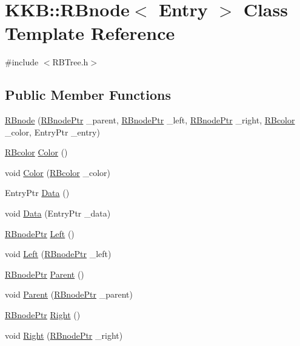 \hypertarget{class_k_k_b_1_1_r_bnode}{}\section{K\+KB\+:\+:R\+Bnode$<$ Entry $>$ Class Template Reference}
\label{class_k_k_b_1_1_r_bnode}


{\ttfamily \#include $<$R\+B\+Tree.\+h$>$}

\subsection*{Public Member Functions}
\begin{DoxyCompactItemize}
\item 
\hyperlink{class_k_k_b_1_1_r_bnode_a8bc55760f92b921b2c73abaad482d89c}{R\+Bnode} (\hyperlink{class_k_k_b_1_1_r_bnode}{R\+Bnode\+Ptr} \+\_\+parent, \hyperlink{class_k_k_b_1_1_r_bnode}{R\+Bnode\+Ptr} \+\_\+left, \hyperlink{class_k_k_b_1_1_r_bnode}{R\+Bnode\+Ptr} \+\_\+right, \hyperlink{namespace_k_k_b_a8efe8f8963250404085241be900c7548}{R\+Bcolor} \+\_\+color, Entry\+Ptr \+\_\+entry)
\item 
\hyperlink{namespace_k_k_b_a8efe8f8963250404085241be900c7548}{R\+Bcolor} \hyperlink{class_k_k_b_1_1_r_bnode_a584eaab9411cfa40db738fb57da7c8c0}{Color} ()
\item 
void \hyperlink{class_k_k_b_1_1_r_bnode_aa36cfdeb5de0b981971bf76501c7d251}{Color} (\hyperlink{namespace_k_k_b_a8efe8f8963250404085241be900c7548}{R\+Bcolor} \+\_\+color)
\item 
Entry\+Ptr \hyperlink{class_k_k_b_1_1_r_bnode_a9d29b22149e67b0a1949dbf7e2f2c91b}{Data} ()
\item 
void \hyperlink{class_k_k_b_1_1_r_bnode_a5d90a011bb65f28f82a2b14ce6e851a8}{Data} (Entry\+Ptr \+\_\+data)
\item 
\hyperlink{class_k_k_b_1_1_r_bnode}{R\+Bnode\+Ptr} \hyperlink{class_k_k_b_1_1_r_bnode_abee0e42c1fe63794d9bbd3c1664fbb87}{Left} ()
\item 
void \hyperlink{class_k_k_b_1_1_r_bnode_a7f5f958378f8e57ba2353c70374ce1bc}{Left} (\hyperlink{class_k_k_b_1_1_r_bnode}{R\+Bnode\+Ptr} \+\_\+left)
\item 
\hyperlink{class_k_k_b_1_1_r_bnode}{R\+Bnode\+Ptr} \hyperlink{class_k_k_b_1_1_r_bnode_a2ed89e282fb54396dfdb4490d40d1b16}{Parent} ()
\item 
void \hyperlink{class_k_k_b_1_1_r_bnode_ae056624198dd5c5aa277b8485b346356}{Parent} (\hyperlink{class_k_k_b_1_1_r_bnode}{R\+Bnode\+Ptr} \+\_\+parent)
\item 
\hyperlink{class_k_k_b_1_1_r_bnode}{R\+Bnode\+Ptr} \hyperlink{class_k_k_b_1_1_r_bnode_a3dcbd419eb92e27c222343070630dc95}{Right} ()
\item 
void \hyperlink{class_k_k_b_1_1_r_bnode_ad4fa7e5524db92d9c15f59400969b063}{Right} (\hyperlink{class_k_k_b_1_1_r_bnode}{R\+Bnode\+Ptr} \+\_\+right)
\end{DoxyCompactItemize}


